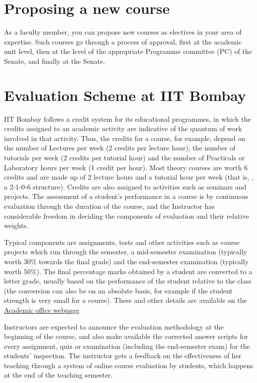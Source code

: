 \documentclass[
  10pt,
  a5paper,
  10pt,
  openany]{amsbook}
\begin{document}
\section{Proposing a new course}\label{proposing-a-new-course}

As a faculty member, you can propose new courses as electives in your
area of expertise. Such courses go through a process of approval, first
at the academic unit level, then at the level of the appropriate
Programme committee (PC) of the Senate, and finally at the Senate.

\section{Evaluation Scheme at IIT
Bombay}\label{evaluation-scheme-at-iit-bombay}

IIT Bombay follows a credit system for its educational programmes, in
which the credits assigned to an academic activity are indicative of the
quantum of work involved in that activity. Thus, the credits for a
course, for example, depend on the number of Lectures per week (2
credits per lecture hour), the number of tutorials per week (2 credits
per tutorial hour) and the number of Practicals or Laboratory hours per
week (1 credit per hour). Most theory courses are worth 6 credits and
are made up of 2 lecture hours and a tutorial hour per week (that is, ,
a 2-1-0-6 structure). Credits are also assigned to activities such as
seminars and projects. The assessment of a student's performance in a
course is by continuous evaluation through the duration of the course,
and the Instructor has considerable freedom in deciding the components
of evaluation and their relative weights.

Typical components are assignments, tests and other activities such as
course projects which run through the semester, a mid-semester
examination (typically worth 30\% towards the final grade) and the
end-semester examination (typically worth 50\%). The final percentage
marks obtained by a student are converted to a letter grade, usually
based on the performance of the student relative to the class (the
conversion can also be on an absolute basis, for example if the student
strength is very small for a course). These and other details are
available on the \href{http://www.iitb.ac.in/acad/index.html}{Academic
office webpage}.

Instructors are expected to announce the evaluation methodology at the
beginning of the course, and also make available the corrected answer
scripts for every assignment, quiz or examination (including the
end-semester exam) for the students' inspection. The instructor gets a
feedback on the effectiveness of her teaching through a system of online
course evaluation by students, which happens at the end of the teaching
semester.
\end{document}

